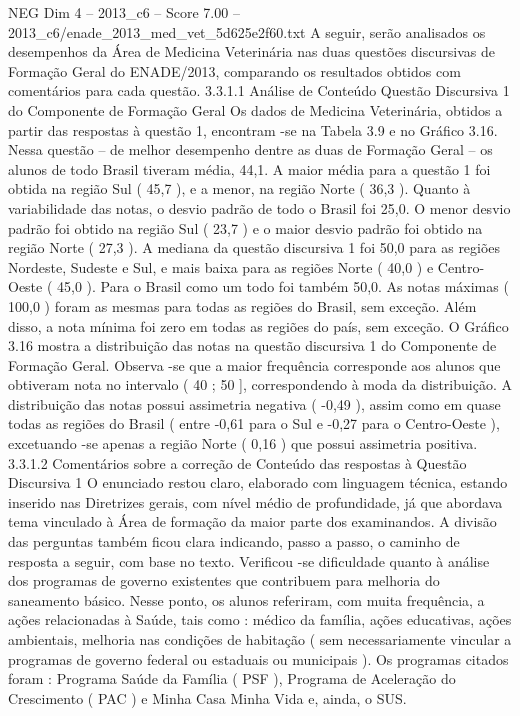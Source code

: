 \begin{textsample}{NEG Dim 4 – 2013\_c6 – Score 7.00 – 2013\_c6/enade\_2013\_med\_vet\_5d625e2f60.txt}
A seguir, serão analisados os desempenhos da Área de Medicina Veterinária nas duas questões discursivas de Formação Geral do ENADE/2013, comparando os resultados obtidos com comentários para cada questão. 3.3.1.1 Análise de Conteúdo Questão Discursiva 1 do Componente de Formação Geral Os dados de Medicina Veterinária, obtidos a partir das respostas à questão 1, encontram -se na Tabela 3.9 e no Gráfico 3.16.
Nessa questão – de melhor desempenho dentre as duas de Formação Geral – os alunos de todo Brasil tiveram média, 44,1.
A maior média para a questão 1 foi obtida na região Sul ( 45,7 ), e a menor, na região Norte ( 36,3 ).
Quanto à variabilidade das notas, o desvio padrão de todo o Brasil foi 25,0.
O menor desvio padrão foi obtido na região Sul ( 23,7 ) e o maior desvio padrão foi obtido na região Norte ( 27,3 ).
A mediana da questão discursiva 1 foi 50,0 para as regiões Nordeste, Sudeste e Sul, e mais baixa para as regiões Norte ( 40,0 ) e Centro-Oeste ( 45,0 ).
Para o Brasil como um todo foi também 50,0.
As notas máximas ( 100,0 ) foram as mesmas para todas as regiões do Brasil, sem exceção.
Além disso, a nota mínima foi zero em todas as regiões do país, sem exceção.
O Gráfico 3.16 mostra a distribuição das notas na questão discursiva 1 do Componente de Formação Geral.
Observa -se que a maior frequência corresponde aos alunos que obtiveram nota no intervalo ( 40 ; 50 ], correspondendo à moda da distribuição.
A distribuição das notas possui assimetria negativa ( -0,49 ), assim como em quase todas as regiões do Brasil ( entre -0,61 para o Sul e -0,27 para o Centro-Oeste ), excetuando -se apenas a região Norte ( 0,16 ) que possui assimetria positiva. 3.3.1.2 Comentários sobre a correção de Conteúdo das respostas à Questão Discursiva 1 O enunciado restou claro, elaborado com linguagem técnica, estando inserido nas Diretrizes gerais, com nível médio de profundidade, já que abordava tema vinculado à Área de formação da maior parte dos examinandos.
A divisão das perguntas também ficou clara indicando, passo a passo, o caminho de resposta a seguir, com base no texto.
Verificou -se dificuldade quanto à análise dos programas de governo existentes que contribuem para melhoria do saneamento básico.
Nesse ponto, os alunos referiram, com muita frequência, a ações relacionadas à Saúde, tais como : médico da família, ações educativas, ações ambientais, melhoria nas condições de habitação ( sem necessariamente vincular a programas de governo federal ou estaduais ou municipais ).
Os programas citados foram : Programa Saúde da Família ( PSF ), Programa de Aceleração do Crescimento ( PAC ) e Minha Casa Minha Vida e, ainda, o SUS.

\end{textsample}
